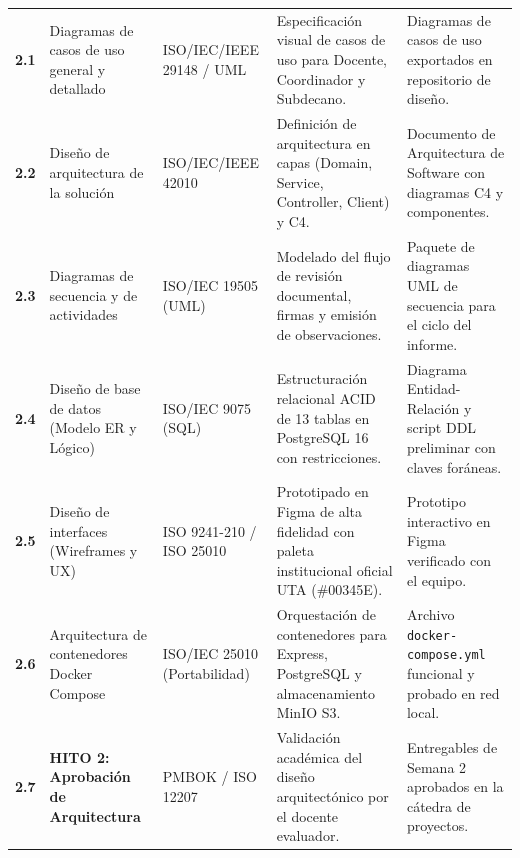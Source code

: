 \documentclass[12pt,a4paper]{article}
\begin{document}
\begin{longtable}{|>{\centering\arraybackslash}m{1.4cm}|>{\raggedright\arraybackslash}m{3.2cm}|>{\raggedright\arraybackslash}m{2.6cm}|>{\raggedright\arraybackslash}m{4.6cm}|>{\raggedright\arraybackslash}m{3.4cm}|}
\multicolumn{5}{|l|}{\cellcolor{lightgraybg}\textbf{FASE 2: DISEÑO RÁPIDO Y ARQUITECTURA}} \\ \hline
\textbf{2.1} & Diagramas de casos de uso general y detallado & ISO/IEC/IEEE 29148 / UML & Especificación visual de casos de uso para Docente, Coordinador y Subdecano. & Diagramas de casos de uso exportados en repositorio de diseño. \\ \hline
\textbf{2.2} & Diseño de arquitectura de la solución & ISO/IEC/IEEE 42010 & Definición de arquitectura en capas (Domain, Service, Controller, Client) y C4. & Documento de Arquitectura de Software con diagramas C4 y componentes. \\ \hline
\textbf{2.3} & Diagramas de secuencia y de actividades & ISO/IEC 19505 (UML) & Modelado del flujo de revisión documental, firmas y emisión de observaciones. & Paquete de diagramas UML de secuencia para el ciclo del informe. \\ \hline
\textbf{2.4} & Diseño de base de datos (Modelo ER y Lógico) & ISO/IEC 9075 (SQL) & Estructuración relacional ACID de 13 tablas en PostgreSQL 16 con restricciones. & Diagrama Entidad-Relación y script DDL preliminar con claves foráneas. \\ \hline
\textbf{2.5} & Diseño de interfaces (Wireframes y UX) & ISO 9241-210 / ISO 25010 & Prototipado en Figma de alta fidelidad con paleta institucional oficial UTA (\#00345E). & Prototipo interactivo en Figma verificado con el equipo. \\ \hline
\textbf{2.6} & Arquitectura de contenedores Docker Compose & ISO/IEC 25010 (Portabilidad) & Orquestación de contenedores para Express, PostgreSQL y almacenamiento MinIO S3. & Archivo \texttt{docker-compose.yml} funcional y probado en red local. \\ \hline
\textbf{2.7} & \textbf{HITO 2: Aprobación de Arquitectura} & PMBOK / ISO 12207 & Validación académica del diseño arquitectónico por el docente evaluador. & Entregables de Semana 2 aprobados en la cátedra de proyectos. \\ \hline


\end{longtable}
\end{document}
